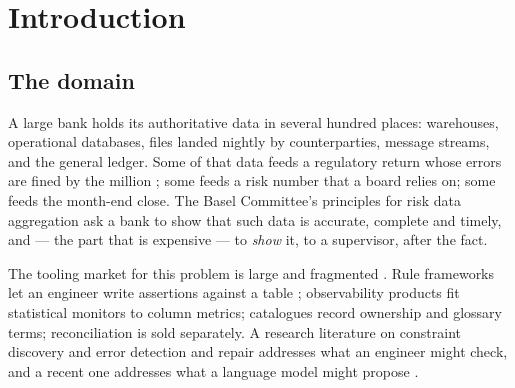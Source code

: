 \documentclass[11pt,a4paper]{article}
\renewcommand{\_}{\oldunderscore\allowbreak}
\theoremstyle{plain}
\theoremstyle{definition}
\theoremstyle{remark}
\begin{document}
\begin{abstract}
On that base we give formal accounts of reconciliation with tolerances and timing offsets, of column
lineage read from code (parsed, never executed) and the controls it can and cannot justify, of trust
propagation as a choice of combining operations (only one of which is, strictly, a semiring), and of
false-alarm budgets as conformal $p$-values with
false-discovery-rate selection. Every formal claim is marked with what carries it in \textsc{Prama}, the
system the author built to this account: a named test, prose, or nothing. The markers are not uniformly
favourable. Two results are negative and are reported in the body: a lineage graph of value flow alone
cannot see a defect that acts through a join predicate (so \textsc{Prama} now records a join as a separate,
row-population edge), and on its own labelled defect benchmark \textsc{Prama}'s declared path finds 10 of 28
planted defects and none in the relational, temporal or semantic families.  counts what runs.
\end{abstract}

\tableofcontents
\newpage

\section{Introduction}\label{sec:intro}

\subsection{The domain}

A large bank holds its authoritative data in several hundred places: warehouses, operational databases,
files landed nightly by counterparties, message streams, and the general ledger. Some of that data feeds a
regulatory return whose errors are fined by the million \cite{ateam2024}; some feeds a risk number that a
board relies on; some feeds the month-end close. The Basel Committee's principles for risk data aggregation
\cite{bcbs239} ask a bank to show that such data is accurate, complete and timely, and --- the part that is
expensive --- to \emph{show} it, to a supervisor, after the fact.

The tooling market for this problem is large and fragmented \cite{gartner2025adq,datakitchen2026}. Rule
frameworks let an engineer write assertions against a table \cite{deequ,tfdv}; observability products fit
statistical monitors to column metrics; catalogues record ownership and glossary terms; reconciliation is
sold separately. A research literature on constraint discovery \cite{metanome,fdeval,dcdiscovery} and error
detection and repair \cite{holoclean,rahabaran} addresses what an engineer might check, and a recent one
addresses what a language model might propose \cite{llmdqr,llmtabular,tuwien,zeroed}.
\end{document}
